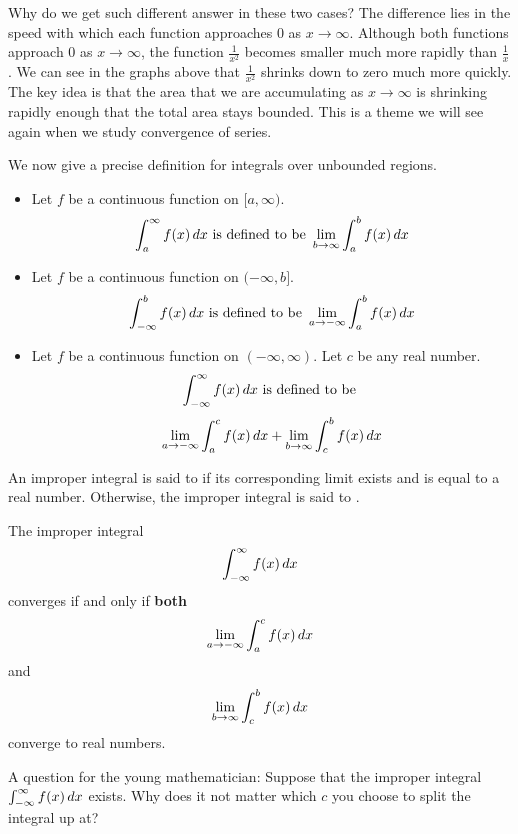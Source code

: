 \documentclass{ximera}
\begin{document}
Why do we get such different answer in these two cases?  The difference lies in the speed with which each function approaches $0$ as $x \to \infty$. Although both functions approach $0$ as $x \to \infty$, the function $\frac{1}{x^{2}}$ becomes smaller much more rapidly than $\frac{1}{x}$. 
We can see in the graphs above that $\frac{1}{x^{2}}$ shrinks down to zero much more quickly. The key idea is that the area that we are accumulating as $x\to \infty$ is shrinking rapidly enough that the total area stays bounded. This is a theme we will see again when we study convergence of series. 

We now give a precise definition for integrals over unbounded regions.

\begin{definition}\hfil
\begin{itemize}
\item Let $f$ be a continuous function on $[a,\infty)$.
  \[
  \int_a^\infty f(x) \mathop{}\!d x \text{ is defined to be } \lim_{b\to\infty}\int_a^b f(x) \mathop{}\!d x
  \]
\item Let $f$ be a continuous function on $(-\infty,b]$.
  \[
  \int_{-\infty}^b f(x) \mathop{}\!d x \text{ is defined to be } \lim_{a\to-\infty}\int_a^b f(x) \mathop{}\!d x
  \]
\item Let $f$ be a continuous function on $(-\infty,\infty)$. Let $c$
  be any real number.
  \[
  \int_{-\infty}^\infty f(x) \mathop{}\!d x \text{ is defined to be }
  \]
  \[
  \lim_{a\to-\infty}\int_a^c f(x) \mathop{}\!d x + \lim_{b\to\infty}\int_c^b
  f(x) \mathop{}\!d x
  \]
\end{itemize}
An improper integral is said to  if its corresponding
limit exists and is equal to a real number. Otherwise, the improper
integral is said to . 
\end{definition}

\begin{warning}
  The improper integral
  \[
  \int_{-\infty}^\infty f(x) \mathop{}\!d x
  \]
  converges if and only if \textbf{both}
  \[
  \lim_{a\to-\infty}\int_a^c f(x) \mathop{}\!d x
  \]
  and
  \[
  \lim_{b\to\infty}\int_c^b
  f(x) \mathop{}\!d x
  \]
  converge to real numbers.
\end{warning}

A question for the young mathematician: Suppose that the improper
integral $\int_{-\infty}^\infty f(x) \mathop{}\!d x$ exists.  Why does it not
matter which $c$ you choose to split the integral up at?
\end{document}
